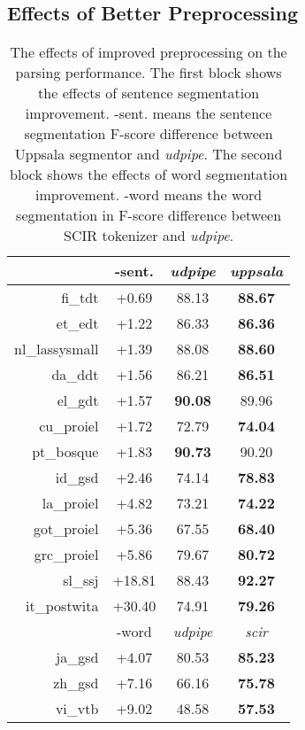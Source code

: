 \documentclass[11pt,a4paper]{article}
\begin{document}
\subsection{Effects of Better Preprocessing}
\begin{table}[t]
  \centering
  \small
  \begin{tabular}{rccc}
     & -sent. & \textit{udpipe} & \textit{uppsala} \\
    \hline
    fi\_tdt & +0.69 & 88.13 & \textbf{88.67} \\
    et\_edt & +1.22 & 86.33 & \textbf{86.36} \\
    nl\_lassysmall & +1.39 & 88.08 & \textbf{88.60} \\
    da\_ddt & +1.56 & 86.21 & \textbf{86.51} \\
    el\_gdt & +1.57 & \textbf{90.08} & 89.96  \\
    cu\_proiel & +1.72 & 72.79 & \textbf{74.04} \\
    pt\_bosque & +1.83 & \textbf{90.73} & 90.20 \\
    id\_gsd & +2.46 & 74.14 & \textbf{78.83} \\
    la\_proiel & +4.82 & 73.21 & \textbf{74.22} \\
    got\_proiel & +5.36 & 67.55 & \textbf{68.40} \\
    grc\_proiel & +5.86 & 79.67 & \textbf{80.72} \\
    sl\_ssj & +18.81& 88.43 & \textbf{92.27} \\
    it\_postwita & +30.40 &74.91 & \textbf{79.26} \\
    \hline
    \hline
    & -word & \textit{udpipe} & \textit{scir} \\
    ja\_gsd & +4.07 & 80.53 & \textbf{85.23} \\
    zh\_gsd & +7.16 & 66.16 & \textbf{75.78} \\
    vi\_vtb & +9.02 & 48.58 & \textbf{57.53} \\
  \end{tabular}
\caption{The effects of improved preprocessing on the parsing performance.
	The first block shows the effects of sentence segmentation improvement.
	-sent. means the sentence segmentation F-score  difference between Uppsala segmentor and \textit{udpipe}.
	The second block shows the effects of word segmentation improvement.
	-word means the word segmentation in F-score difference  between SCIR tokenizer and \textit{udpipe}.}\label{tbl:preprocess}
\end{table}
\end{document}
